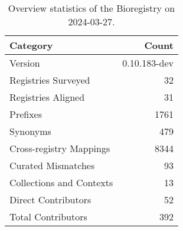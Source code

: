 \begin{table}
\caption{Overview statistics of the Bioregistry on 2024-03-27.}
\label{tab:bioregistry-summary}
\begin{tabular}{lr}
\toprule
Category & Count \\
\midrule
Version & 0.10.183-dev \\
Registries Surveyed & 32 \\
Registries Aligned & 31 \\
Prefixes & 1761 \\
Synonyms & 479 \\
Cross-registry Mappings & 8344 \\
Curated Mismatches & 93 \\
Collections and Contexts & 13 \\
Direct Contributors & 52 \\
Total Contributors & 392 \\
\bottomrule
\end{tabular}
\end{table}

